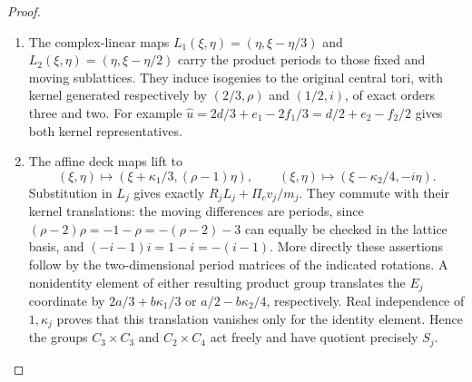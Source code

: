 \begin{proof}
\begin{enumerate}[label=\arabic*.,leftmargin=*]
\item The complex-linear maps $L_1(\xi,\eta)=(\eta,\xi-\eta/3)$ and $L_2(\xi,\eta)=(\eta,\xi-\eta/2)$ carry the product periods to those fixed and moving sublattices. They induce isogenies to the original central tori, with kernel generated respectively by $(2/3,\rho)$ and $(1/2,i)$, of exact orders three and two. For example $\widehat u=2d/3+e_1-2f_1/3=d/2+e_2-f_2/2$ gives both kernel representatives.

\item The affine deck maps lift to
\[
 (\xi,\eta)\longmapsto(\xi+\kappa_1/3,(\rho-1)\eta),\qquad
 (\xi,\eta)\longmapsto(\xi-\kappa_2/4,-i\eta).
\]
Substitution in $L_j$ gives exactly $R_jL_j+\Pi_cv_j/m_j$. They commute with their kernel translations: the moving differences are periods, since $(\rho-2)\rho=-1-\rho=-(\rho-2)-3$ can equally be checked in the lattice basis, and $(-i-1)i=1-i=-(i-1)$. More directly these assertions follow by the two-dimensional period matrices of the indicated rotations. A nonidentity element of either resulting product group translates the $E_j$ coordinate by $2a/3+b\kappa_1/3$ or $a/2-b\kappa_2/4$, respectively. Real independence of $1,\kappa_j$ proves that this translation vanishes only for the identity element. Hence the groups $C_3\times C_3$ and $C_2\times C_4$ act freely and have quotient precisely $S_j$.
\end{enumerate}
\end{proof}